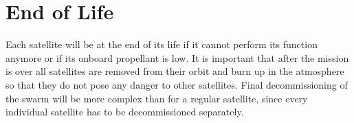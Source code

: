 \section{End of Life}
\label{blSSEOL}

Each satellite will be at the end of its life if it cannot perform its function anymore or if its onboard propellant is low.
It is important that after the mission is over all satellites are removed from their orbit and burn up in the atmosphere so that they do not pose any danger to other satellites.
Final decommissioning of the swarm will be more complex than for a regular satellite, since every individual satellite has to be decommissioned separately.